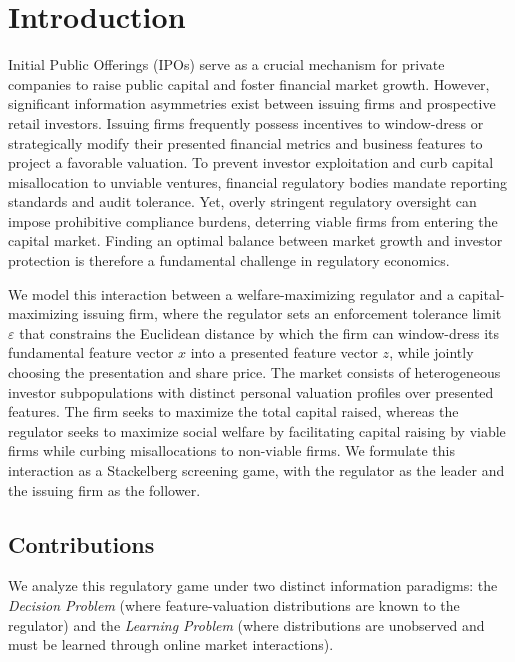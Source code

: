 \section{Introduction}
\label{sec:intro}

Initial Public Offerings (IPOs) serve as a crucial mechanism for private companies to raise public capital and foster financial market growth. However, significant information asymmetries exist between issuing firms and prospective retail investors. Issuing firms frequently possess incentives to window-dress or strategically modify their presented financial metrics and business features to project a favorable valuation. To prevent investor exploitation and curb capital misallocation to unviable ventures, financial regulatory bodies mandate reporting standards and audit tolerance. Yet, overly stringent regulatory oversight can impose prohibitive compliance burdens, deterring viable firms from entering the capital market. Finding an optimal balance between market growth and investor protection is therefore a fundamental challenge in regulatory economics.

We model this interaction between a welfare-maximizing regulator and a capital-maximizing issuing firm, where the regulator sets an enforcement tolerance limit $\varepsilon$ that constrains the Euclidean distance by which the firm can window-dress its fundamental feature vector $x$ into a presented feature vector $z$, while jointly choosing the presentation and share price. The market consists of heterogeneous investor subpopulations with distinct personal valuation profiles over presented features. The firm seeks to maximize the total capital raised, whereas the regulator seeks to maximize social welfare by facilitating capital raising by viable firms while curbing misallocations to non-viable firms. We formulate this interaction as a Stackelberg screening game, with the regulator as the leader and the issuing firm as the follower.


\subsection{Contributions}

We analyze this regulatory game under two distinct information paradigms: the \emph{Decision Problem} (where feature-valuation distributions are known to the regulator) and the \emph{Learning Problem} (where distributions are unobserved and must be learned through online market interactions).

